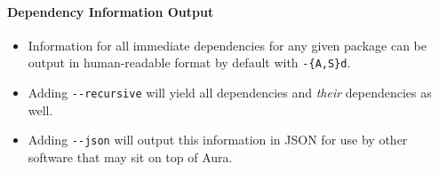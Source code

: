 \documentclass{article}
\begin{document}
\begin{Shaded}
\begin{Highlighting}[]
\NormalTok{\{ [ \{ }\NormalTok{: }
    \NormalTok{, }\NormalTok{: \{ }\NormalTok{: }
               \NormalTok{, }\NormalTok{: } \NormalTok{\}}
    \NormalTok{, }\NormalTok{: [ \{ }\NormalTok{: }
                    \NormalTok{, }\NormalTok{: } \NormalTok{\}}
                  \NormalTok{, \{ }\NormalTok{: }
                    \NormalTok{, }\NormalTok{: } \NormalTok{\}}
                  \NormalTok{]}
    \NormalTok{\}}
  \NormalTok{, \{ }\NormalTok{: }
    \NormalTok{, }\NormalTok{: \{ }\NormalTok{: }
               \NormalTok{, }\NormalTok{: } \NormalTok{\}}
    \NormalTok{, }\NormalTok{: [ \{ }\NormalTok{: }
                    \NormalTok{, }\NormalTok{: } \NormalTok{\}}
                  \NormalTok{]}
    \NormalTok{\}}
  \NormalTok{, \{ }\NormalTok{: }
    \NormalTok{, }\NormalTok{: }
    \NormalTok{, }\NormalTok{: [ \{ }\NormalTok{: }
                    \NormalTok{, }\NormalTok{: } \NormalTok{\}}
                  \NormalTok{, \{ }\NormalTok{: }
                    \NormalTok{, }\NormalTok{: } \NormalTok{\}}
                  \NormalTok{]}
    \NormalTok{\}}
  \NormalTok{]}
\NormalTok{\}}
\end{Highlighting}
\end{Shaded}

\paragraph{Dependency Information
Output}\label{dependency-information-output}

\begin{itemize}
\itemsep1pt\parskip0pt
\item
  Information for all immediate dependencies for any given package can
  be output in human-readable format by default with \texttt{-\{A,S\}d}.
\item
  Adding \texttt{-\/-recursive} will yield all dependencies and
  \emph{their} dependencies as well.
\item
  Adding \texttt{-\/-json} will output this information in JSON for use
  by other software that may sit on top of Aura.
\end{itemize}
\end{document}
